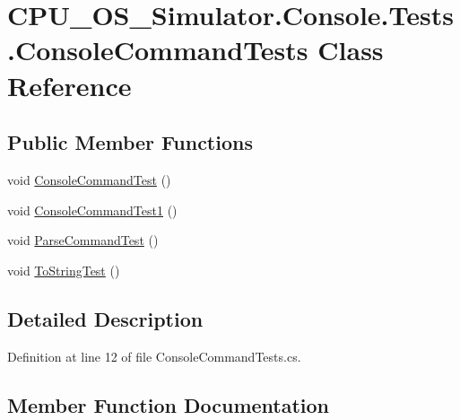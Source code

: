 \hypertarget{class_c_p_u___o_s___simulator_1_1_console_1_1_tests_1_1_console_command_tests}{}\section{C\+P\+U\+\_\+\+O\+S\+\_\+\+Simulator.\+Console.\+Tests.\+Console\+Command\+Tests Class Reference}
\label{class_c_p_u___o_s___simulator_1_1_console_1_1_tests_1_1_console_command_tests}
\subsection*{Public Member Functions}
\begin{DoxyCompactItemize}
\item 
void \hyperlink{class_c_p_u___o_s___simulator_1_1_console_1_1_tests_1_1_console_command_tests_a624e0831eb923cec4407d6525ad8e8e7}{Console\+Command\+Test} ()
\item 
void \hyperlink{class_c_p_u___o_s___simulator_1_1_console_1_1_tests_1_1_console_command_tests_ad0918877f3f76660a5cd1ff50f3a2cb6}{Console\+Command\+Test1} ()
\item 
void \hyperlink{class_c_p_u___o_s___simulator_1_1_console_1_1_tests_1_1_console_command_tests_ae57577697ad0036394fc209d47c6f500}{Parse\+Command\+Test} ()
\item 
void \hyperlink{class_c_p_u___o_s___simulator_1_1_console_1_1_tests_1_1_console_command_tests_ac80abf6f9097ea6615631845204d23d9}{To\+String\+Test} ()
\end{DoxyCompactItemize}


\subsection{Detailed Description}


Definition at line 12 of file Console\+Command\+Tests.\+cs.



\subsection{Member Function Documentation}
\hypertarget{class_c_p_u___o_s___simulator_1_1_console_1_1_tests_1_1_console_command_tests_a624e0831eb923cec4407d6525ad8e8e7}{}
